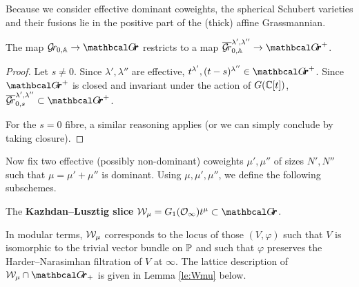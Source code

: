 \documentclass{article} %
\begin{document}

Because we consider effective dominant coweights, the spherical Schubert varieties and their fusions lie in the positive part of the (thick) affine Grassmannian.
% 
\begin{lemma}
\label{le:sphfusispos}
    The map $ \Gr_{0, \AA} \rightarrow \Grth$ restricts to a map $ \overline{\Gr}^{\lambda', \lambda''}_{0, \AA} \rightarrow \Grth^+$.
\end{lemma}
\begin{proof}
    Let $ s \ne 0 $. Since $ \lambda', \lambda'' $ are effective, $ t^{\lambda'}, (t-s)^{\lambda''} \in \Grth^+ $.  Since $\Grth^+$ is closed and invariant under the action of $ G(\mathbb C[t])$,  $ \overline{\Gr}_{0,s}^{\lambda', \lambda''} \subset \Grth^+$.
    
    For the $ s = 0$ fibre, a similar reasoning applies (or we can simply conclude by taking closure).
\end{proof}



Now fix two effective (possibly non-dominant) coweights $ \mu', \mu''$ of sizes $N',N''$ such that $ \mu = \mu' + \mu'' $ is dominant. 
Using $ \mu, \mu', \mu''$, we define the following subschemes.

\begin{definition}
\label{def:klslice}
    The \textbf{Kazhdan--Lusztig slice} $\cW_\mu = G_1(\Oinf) t^\mu \subset \Grth $.  
\end{definition}
% 

In modular terms, $\mathcal W_\mu$ corresponds to the locus of those $ (V, \varphi)$ such that $ V $ is isomorphic to the trivial vector bundle on $ \mathbb P$ and such that $ \varphi$ preserves the {Harder--Narasimhan filtration of $V$ at $ \infty$}. The lattice description of $ \cW_\mu \cap \Grth_+$ is given in Lemma \ref{le:Wmu} below. 
% 
\end{document}
